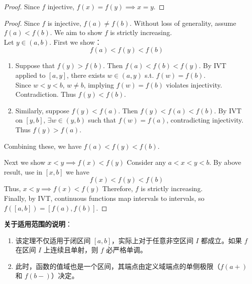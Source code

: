 \documentclass[
	UTF-8,
	11pt, %
	a4paper, %
]{LegrandOrangeBook}
\begin{document}
    \begin{proof}
        Since $f$ injective, $f(x) = f(y) \implies x = y$.
    \end{proof}

    \begin{proof}
    Since $f$ is injective, $f(a) \neq f(b)$.
    Without loss of generality, assume $f(a) < f(b)$. We aim to show $f$ is strictly increasing.\\

    Let $y \in (a, b)$. First we show：
    $$f(a) < f(y) < f(b)$$
    \begin{enumerate}
        \item Suppose that $f(y) > f(b)$. Then $f(a) < f(b) < f(y)$.
        By IVT applied to $[a, y]$, there exists $w \in (a, y)$  s.t. $f(w) = f(b)$.\\

        Since $w < y < b$, $w \neq b$, implying $f(w) = f(b)$ violates injectivity. Contradiction. Thus $f(y) < f(b)$.

        \item Similarly, suppose $f(y) < f(a)$. Then $f(y) < f(a) < f(b)$. By IVT on $[y, b]$, $\exists w \in (y, b)$ such that $f(w) = f(a)$, contradicting injectivity. Thus $f(y) > f(a)$.
    \end{enumerate}

    Combining these, we have $f(a) < f(y) < f(b)$.

    Next we show $x<y \implies f(x)<f(y)$
    Consider any $a < x < y < b$.
    By above result, use in $[x, b]$ we have
    $$f(x) < f(y) < f(b)$$
    Thus, $x < y \implies f(x) < f(y)$
    Therefore, $f$ is strictly increasing.\\

    Finally, by IVT, continuous functions map intervals to intervals, so $f([a, b]) = [f(a), f(b)]$.
    \end{proof}

    \begin{remark}
    \textbf{关于适用范围的说明}：
    \begin{enumerate}
        \item 该定理不仅适用于闭区间 $[a,b]$，实际上对于任意非空区间 $I$ 都成立。如果 $f$ 在区间 $I$ 上连续且单射，则 $f$ 必严格单调。
        \item 此时，函数的值域也是一个区间，其端点由定义域端点的单侧极限（$f(a+)$ 和 $f(b-)$）决定。
    \end{enumerate}
    \end{remark}
    
\end{document}
